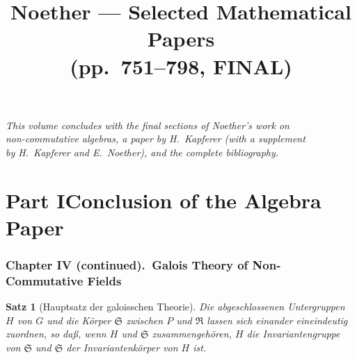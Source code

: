 \documentclass[12pt,a4paper]{article}
\title{\textbf{Noether --- Selected Mathematical Papers}\\[0.5em]
\large (pp.~751--798, FINAL)}
\author{}
\date{}
\theoremstyle{plain}
\newtheorem{satz}{Satz}[section]
\theoremstyle{definition}
\theoremstyle{remark}
\begin{document}
\renewenvironment{noetherpaper}[4]{\newpage\section*{#1}\addcontentsline{toc}{section}{#1}\par\smallskip}{\par\medskip}

\thispagestyle{empty}

\vfill
\begin{center}
\textit{This volume concludes with the final sections of Noether's work on}\\
\textit{non-commutative algebras, a paper by H.~Kapferer (with a supplement}\\
\textit{by H.~Kapferer and E.~Noether), and the complete bibliography.}
\end{center}
\vfill
\newpage

\newpage

\part*{Part I\hspace{1em}Conclusion of the Algebra Paper}

\section*{Chapter IV (continued).\ Galois Theory of Non-Commutative Fields}

\setcounter{section}{21}
\setcounter{satz}{10}

\begin{satz}[Hauptsatz der galoisschen Theorie]\label{satz:11}
Die abgeschlossenen Untergruppen $H$ von $G$ und die K\"orper $\mathfrak{S}$ zwischen
$P$ und $\mathfrak{R}$ lassen sich einander eineindeutig zuordnen, so da\ss, wenn $H$ und
$\mathfrak{S}$ zusammengeh\"oren, $H$ die Invariantengruppe von $\mathfrak{S}$ und $\mathfrak{S}$ der
Invariantenk\"orper von $H$ ist.
\end{satz}
\end{document}
